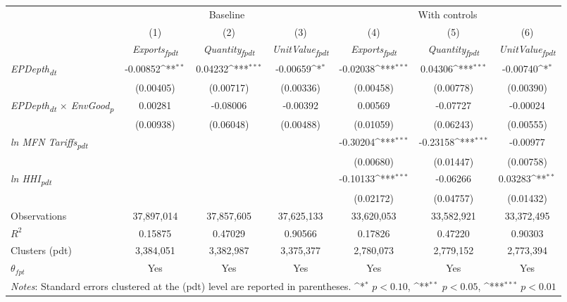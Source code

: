 {
\def\sym#1{\ifmmode^{#1}\else\(^{#1}\)\fi}
\begin{tabular}{l*{6}{c}}
\toprule
&\multicolumn{3}{c}{Baseline}&\multicolumn{3}{c}{With controls}\\\cmidrule(lr){2-4}\cmidrule(lr){5-7}
&(1)&(2)&(3)&(4)&(5)&(6)\\
&\textit{Exports\textsubscript{fpdt}}&\textit{Quantity\textsubscript{fpdt}}&\textit{UnitValue\textsubscript{fpdt}}&\textit{Exports\textsubscript{fpdt}}&\textit{Quantity\textsubscript{fpdt}}&\textit{UnitValue\textsubscript{fpdt}}\\
\midrule
\textit{EPDepth\textsubscript{dt}} & -0.00852\sym{**} & 0.04232\sym{***} & -0.00659\sym{*} & -0.02038\sym{***} & 0.04306\sym{***} & -0.00740\sym{*}\\
 & (0.00405) & (0.00717) & (0.00336) & (0.00458) & (0.00778) & (0.00390)\\
\addlinespace
\textit{EPDepth\textsubscript{dt} $\times$ EnvGood\textsubscript{p}} & 0.00281 & -0.08006 & -0.00392 & 0.00569 & -0.07727 & -0.00024\\
 & (0.00938) & (0.06048) & (0.00488) & (0.01059) & (0.06243) & (0.00555)\\
\addlinespace
\textit{ln MFN Tariffs\textsubscript{pdt}} &  &  &  & -0.30204\sym{***} & -0.23158\sym{***} & -0.00977\\
 &  &  &  & (0.00680) & (0.01447) & (0.00758)\\
\addlinespace
\textit{ln HHI\textsubscript{pdt}} &  &  &  & -0.10133\sym{***} & -0.06266 & 0.03283\sym{**}\\
 &  &  &  & (0.02172) & (0.04757) & (0.01432)\\
\midrule
Observations & 37,897,014 & 37,857,605 & 37,625,133 & 33,620,053 & 33,582,921 & 33,372,495\\
$R^{2}$ & 0.15875 & 0.47029 & 0.90566 & 0.17826 & 0.47220 & 0.90303\\
Clusters (pdt) & 3,384,051 & 3,382,987 & 3,375,377 & 2,780,073 & 2,779,152 & 2,773,394\\
$\theta_{fpt}$ & Yes & Yes & Yes & Yes & Yes & Yes\\
\bottomrule
\multicolumn{7}{l}{\footnotesize \textit{Notes}: Standard errors clustered at the (pdt) level are reported in parentheses. \sym{*} \(p<0.10\), \sym{**} \(p<0.05\), \sym{***} \(p<0.01\)}\\
\end{tabular}
}
